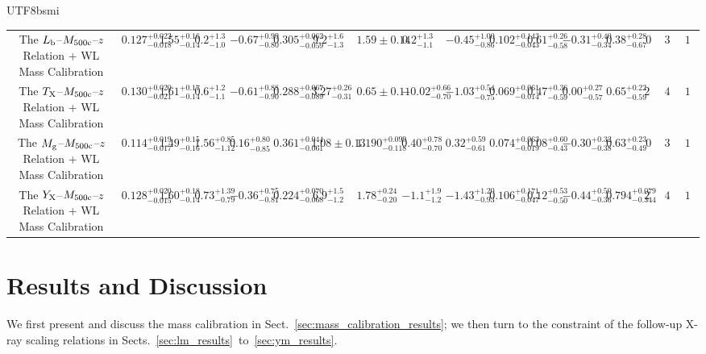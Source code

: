 \documentclass[longauth]{aa}
\begin{document}
\begin{CJK*}{UTF8}{bsmi}
\begin{table}
{\begin{tabular}{ccccccccccccccccc}
                The $L_{\rm{b}}$--$M_{500\rm{c}}$--$z$ Relation + WL Mass Calibration & $0.127^{+0.022}_{-0.018}$ & $1.55^{+0.16}_{-0.14}$ & $0.2^{+1.3}_{-1.0}$ & $-0.67^{+0.99}_{-0.80}$ & $0.305^{+0.062}_{-0.059}$ & $9.2^{+1.6}_{-1.3}$ & $1.59\pm 0.14$ & $0.2^{+1.3}_{-1.1}$ & $-0.45^{+1.00}_{-0.86}$ & $0.102^{+0.143}_{-0.043}$ & $0.61^{+0.26}_{-0.58}$ & $-0.31^{+0.40}_{-0.34}$ & $0.38^{+0.28}_{-0.67}$ & $0$ & $313$ & $121$ \\ [3pt]
                The $T_{\rm{X}}$--$M_{500\rm{c}}$--$z$ Relation + WL Mass Calibration & $0.130^{+0.020}_{-0.021}$ & $1.61^{+0.17}_{-0.14}$ & $0.6^{+1.2}_{-1.1}$ & $-0.61^{+0.88}_{-0.90}$ & $0.288^{+0.067}_{-0.089}$ & $3.27^{+0.26}_{-0.31}$ & $0.65\pm 0.11$ & $-0.02^{+0.66}_{-0.70}$ & $-1.03^{+0.54}_{-0.75}$ & $0.069^{+0.061}_{-0.014}$ & $0.47^{+0.36}_{-0.59}$ & $0.00^{+0.27}_{-0.57}$ & $0.65^{+0.22}_{-0.59}$ & $266$ & $47$ & $17$ \\ [3pt]
                The $M_{\rm{g}}$--$M_{500\rm{c}}$--$z$ Relation + WL Mass Calibration & $0.114^{+0.019}_{-0.017}$ & $1.49^{+0.15}_{-0.16}$ & $1.56^{+0.85}_{-1.12}$ & $0.16^{+0.80}_{-0.85}$ & $0.361^{+0.044}_{-0.061}$ & $1.08\pm 0.13$ & $1.190^{+0.099}_{-0.118}$ & $0.40^{+0.78}_{-0.70}$ & $0.32^{+0.59}_{-0.61}$ & $0.074^{+0.063}_{-0.019}$ & $0.08^{+0.60}_{-0.43}$ & $-0.30^{+0.32}_{-0.38}$ & $0.63^{+0.23}_{-0.49}$ & $0$ & $313$ & $121$ \\ [3pt]
                The $Y_{\rm{X}}$--$M_{500\rm{c}}$--$z$ Relation + WL Mass Calibration & $0.128^{+0.020}_{-0.015}$ & $1.60^{+0.18}_{-0.14}$ & $0.73^{+1.39}_{-0.79}$ & $-0.36^{+0.75}_{-0.81}$ & $0.224^{+0.070}_{-0.068}$ & $6.9^{+1.5}_{-1.2}$ & $1.78^{+0.24}_{-0.20}$ & $-1.1^{+1.9}_{-1.2}$ & $-1.43^{+1.20}_{-0.93}$ & $0.106^{+0.171}_{-0.047}$ & $0.12^{+0.53}_{-0.50}$ & $-0.44^{+0.50}_{-0.36}$ & $0.794^{+0.079}_{-0.344}$ & $266$ & $47$ & $17$ \\ [3pt]
                \hline
    \end{tabular}
    }
\end{table}
%


%
%

\section{Results and Discussion}
\label{sec:results}


We first present and discuss the mass calibration in Sect.~\ref{sec:mass_calibration_results}; we then turn to the constraint of the follow-up X-ray scaling relations in Sects.~\ref{sec:lm_results}~to~\ref{sec:ym_results}.



\end{CJK*}
\end{document}
